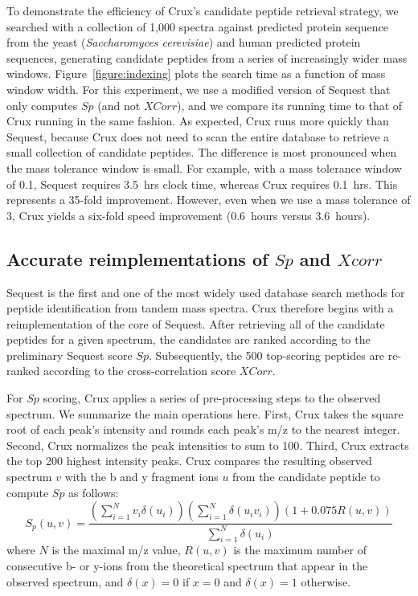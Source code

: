\documentclass[12pt]{article}
\begin{document}
To demonstrate the efficiency of Crux's candidate peptide retrieval
strategy, we searched with a collection of 1,000 spectra against predicted 
protein sequence from the yeast ({\em Saccharomyces cerevisiae}) and 
human predicted protein sequences, 
generating candidate peptides from a series of increasingly wider
mass windows.  Figure~\ref{figure:indexing} plots the search time as a
function of mass window width.  For this experiment, we use a modified
version of {\sc Sequest} that only computes $Sp$ (and not $XCorr$), and we
compare its running time to that of Crux running in the same fashion.
As expected, Crux runs more quickly than {\sc Sequest}, because Crux does
not need to scan the entire database to retrieve a small collection of
candidate peptides.  The difference is most pronounced when the mass
tolerance window is small.  For example, with a mass tolerance window
of 0.1, {\sc Sequest} requires 3.5~hrs clock time, whereas Crux requires
0.1~hrs.  This represents a 35-fold improvement.  However, even when
we use a mass tolerance of 3, Crux yields a six-fold speed improvement
(0.6~hours versus 3.6~hours).  

\subsection{Accurate reimplementations of $Sp$ and $Xcorr$}

{\sc Sequest} is the first and one of the most widely used database
search methods for peptide identification from tandem mass spectra.
Crux therefore begins with a reimplementation of the core of {\sc
Sequest}.  After retrieving all of the candidate peptides for a given
spectrum, the candidates are ranked according to the preliminary {\sc
Sequest} score $Sp$.  Subsequently, the 500 top-scoring peptides are
re-ranked according to the cross-correlation score $XCorr$.

For $Sp$ scoring, Crux applies a series of pre-processing steps to the
observed spectrum.  We summarize the main operations here.  First,
Crux takes the square root of each peak's intensity and rounds each
peak's m/z to the nearest integer.  Second, Crux normalizes the peak
intensities to sum to 100.  Third, Crux extracts the top 200 highest
intensity peaks.  Crux compares the resulting observed spectrum $v$
with the b and y fragment ions $u$ from the candidate peptide to
compute $Sp$ as follows:
\[
S_p(u, v) = \frac{
\left(\sum_{i=1}^N v_i \delta(u_i) \right)
\left(\sum_{i=1}^N \delta(u_i v_i)\right)
\left(1 + 0.075 R(u, v) \right)
}{\sum_{i=1}^N \delta(u_i)}
\]
where $N$ is the maximal m/z value, $R(u, v)$ is the maximum number of
consecutive b- or y-ions from the theoretical spectrum that appear in
the observed spectrum, and $\delta(x) = 0$ if $x=0$ and $\delta(x) =
1$ otherwise.
\end{document}

